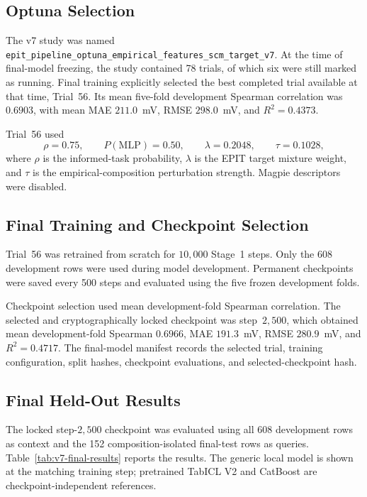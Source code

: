 \documentclass{article}
\begin{document}
\subsection{Optuna Selection}

The v7 study was named
\texttt{epit\_pipeline\_optuna\_empirical\_features\_scm\_target\_v7}.
At the time of final-model freezing, the study contained 78 trials, of which
six were still marked as running. Final training explicitly selected the best
completed trial available at that time, Trial~56. Its mean five-fold
development Spearman correlation was \(0.6903\), with mean MAE
\(211.0\)~mV, RMSE \(298.0\)~mV, and \(R^2=0.4373\).

Trial~56 used
\[
\rho=0.75,\qquad
P(\mathrm{MLP})=0.50,\qquad
\lambda=0.2048,\qquad
\tau=0.1028,
\]
where \(\rho\) is the informed-task probability, \(\lambda\) is the EPIT target
mixture weight, and \(\tau\) is the empirical-composition perturbation
strength. Magpie descriptors were disabled.

\subsection{Final Training and Checkpoint Selection}

Trial~56 was retrained from scratch for \(10{,}000\) Stage~1 steps. Only the
608 development rows were used during model development. Permanent
checkpoints were saved every 500 steps and evaluated using the five frozen
development folds.

Checkpoint selection used mean development-fold Spearman correlation. The
selected and cryptographically locked checkpoint was step~\(2{,}500\), which
obtained mean development-fold Spearman \(0.6966\), MAE \(191.3\)~mV,
RMSE \(280.9\)~mV, and \(R^2=0.4717\). The final-model manifest records the
selected trial, training configuration, split hashes, checkpoint evaluations,
and selected-checkpoint hash.

\subsection{Final Held-Out Results}

The locked step-\(2{,}500\) checkpoint was evaluated using all 608 development
rows as context and the 152 composition-isolated final-test rows as queries.
Table~\ref{tab:v7-final-results} reports the results. The generic local model
is shown at the matching training step; pretrained TabICL V2 and CatBoost are
checkpoint-independent references.
\end{document}

